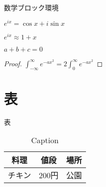 \documentclass[lualatex,aspectratio=169,unicode, 12pt]{beamer}
\begin{document}
\begin{frame}[plain]{数学ブロック環境}
 \begin{theorem}[定義名]
  $e^{ix} = \cos x + i \sin x$
 \end{theorem}
 \begin{definition}[定義名]
  $e^{ix} \approx 1 + x$
 \end{definition}
 \begin{corollary}[系名]
  $a + b + c = 0$
 \end{corollary}
 \begin{proof}
  $\int_{-\infty}^{\infty} e^{-a x^{2}} = 2 \int_{0}^{\infty} e^{-a x^{2}}$
 \end{proof}
\end{frame}

\section{表}
\begin{frame}[plain]{表}
 \begin{table}
  \caption{Caption}
  \label{table:sample}
  \centering
  \begin{tabular}{ccc}
   \hline
   料理& 値段 & 場所 \\
   \hline \hline
   チキン & 200円 & 公園\\
   \hline
  \end{tabular}
 \end{table}
\end{frame}
\end{document}
